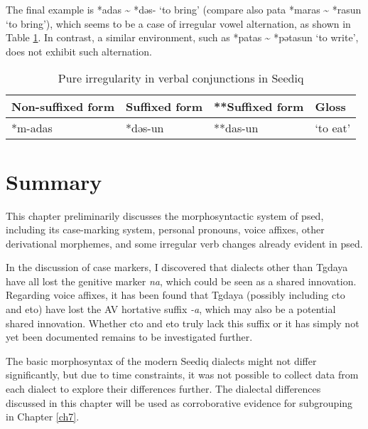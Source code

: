 The final example is *adas \~{} *dəs- `to bring' (compare also \acl{pata} *maras \~{} *rasun `to bring'), which seems to be a case of irregular vowel alternation, as shown in Table \ref{tab:psed_v_irr}. In contrast, a similar environment, such as *patas \~{} *pətasun `to write', does not exhibit such alternation.

\begin{table}[!htbp]
\centering
\caption{Pure irregularity in verbal conjunctions in Seediq}
\label{tab:psed_v_irr}
\begin{tabular}{llll}
\hline
Non-suffixed form & Suffixed form & **Suffixed form & Gloss     \\ \hline
*m-adas           & *dəs-un       & **das-un        & `to eat'  \\ \hline
\end{tabular}
\end{table}

\section{Summary}




This chapter preliminarily discusses the morphosyntactic system of \acl{psed}, including its case-marking system, personal pronouns, voice affixes, other derivational morphemes, and some irregular verb changes already evident in \acl{psed}.

In the discussion of case markers, I discovered that dialects other than Tgdaya have all lost the genitive marker \textit{na}, which could be seen as a shared innovation. Regarding voice affixes, it has been found that Tgdaya (possibly including \acl{cto} and \acl{eto}) have lost the AV hortative suffix \textit{-a}, which may also be a potential shared innovation. Whether \acl{cto} and \acl{eto} truly lack this suffix or it has simply not yet been documented remains to be investigated further.

The basic morphosyntax of the modern Seediq dialects might not differ significantly, but due to time constraints, it was not possible to collect data from each dialect to explore their differences further. The dialectal differences discussed in this chapter will be used as corroborative evidence for subgrouping in Chapter \ref{ch7}.